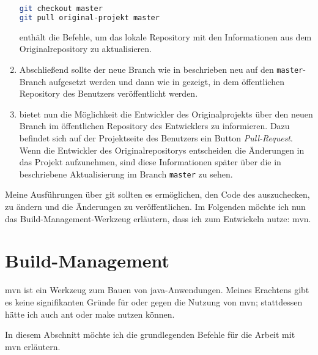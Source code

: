 \begin{enumerate}
\begin{lstlisting}[language=sh,caption={Mit git den Branch \texttt{master} auschecken und aktualisieren},label=\lstlbl{git-master-original-aktualisieren}]
git checkout master
git pull original-projekt master
\end{lstlisting}

 enthält die Befehle, um das lokale Repository mit den Informationen aus dem Originalrepository zu aktualisieren.

\item Abschließend sollte der neue Branch wie in  beschrieben neu auf den \texttt{master}-Branch aufgesetzt werden und dann wie in  gezeigt, in dem öffentlichen Repository des Benutzers veröffentlicht werden.

\item {} bietet nun die Möglichkeit die Entwickler des Originalprojekts über den neuen Branch im öffentlichen Repository des Entwicklers zu informieren. Dazu befindet sich auf der Projektseite des Benutzers ein Button \emph{Pull-Request}. Wenn die Entwickler des Originalrepositorys entscheiden die Änderungen in das Projekt aufzunehmen, sind diese Informationen später über die in  beschriebene Aktualisierung im Branch \texttt{master} zu sehen.
\end{enumerate}

Meine Ausführungen über \gls{git} sollten es ermöglichen, den Code des \md auszuchecken, zu ändern und die Änderungen zu veröffentlichen. Im Folgenden möchte ich nun das Build-Management-Werkzeug erläutern, dass ich zum Entwickeln nutze: \gls{mvn}.

\section{Build-Management}
\gls{mvn} ist ein Werkzeug zum Bauen von \gls{java}-Anwendungen. Meines Erachtens gibt es keine signifikanten Gründe für oder gegen die Nutzung von \gls{mvn}; stattdessen hätte ich auch \gls{ant} oder \gls{make} nutzen können.

In diesem Abschnitt möchte ich die grundlegenden Befehle für die Arbeit mit \gls{mvn} erläutern.


